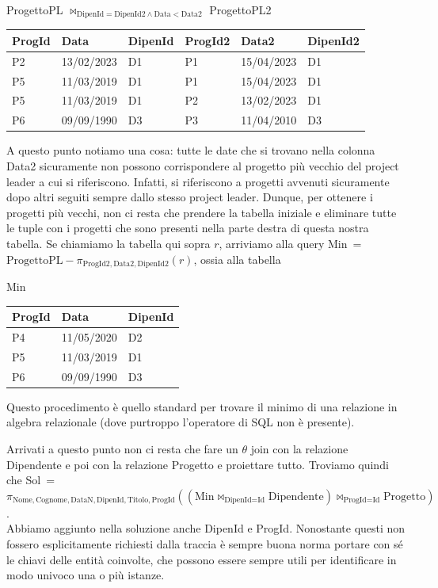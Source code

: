 \documentclass[11pt, a4paper, titlepage, oneside]{scrbook}
\begin{document}
\begin{center}
ProgettoPL $\bowtie_{\text{DipenId} = \text{DipenId2} \land \text{Data} < \text{Data2}}$ ProgettoPL2 \nopagebreak
    
\begin{tabular}{|l|l|l|l|l|l|}
\hline
\textbf{ProgId} & \textbf{Data} & \textbf{DipenId} & \textbf{ProgId2} & \textbf{Data2} & \textbf{DipenId2}\\ \hline
P2 & 13/02/2023 & D1 & P1 & 15/04/2023 & D1 \\
P5 & 11/03/2019 & D1 & P1 & 15/04/2023 & D1 \\
P5 & 11/03/2019 & D1 & P2 & 13/02/2023 & D1 \\
P6 & 09/09/1990 & D3 & P3 & 11/04/2010 & D3 \\\hline
\end{tabular}
\end{center}


A questo punto notiamo una cosa: tutte le date che si trovano nella colonna Data2 sicuramente non possono corrispondere al progetto più vecchio del project leader a cui si riferiscono. Infatti, si riferiscono a progetti avvenuti sicuramente dopo altri seguiti sempre dallo stesso project leader. Dunque, per ottenere i progetti più vecchi, non ci resta che prendere la tabella iniziale e eliminare tutte le tuple con i progetti che sono presenti nella parte destra di questa nostra tabella. Se chiamiamo la tabella qui sopra $r$, arriviamo alla query \mbox{Min = $\text{ProgettoPL} - \pi_{\text{ProgId2}, \text{Data2}, \text{DipenId2}}(r)$}, ossia alla tabella

\begin{center}
Min \nopagebreak
    
\begin{tabular}{|l|l|l|}
\hline
\textbf{ProgId} & \textbf{Data} & \textbf{DipenId}  \\ \hline
P4 & 11/05/2020 & D2 \\
P5 & 11/03/2019 & D1 \\
P6 & 09/09/1990 & D3 \\ \hline
\end{tabular}
\end{center}

Questo procedimento è quello standard per trovare il minimo di una relazione in algebra relazionale (dove purtroppo l'operatore  di SQL non è presente).

Arrivati a questo punto non ci resta che fare un $\theta$ join con la relazione Dipendente e poi con la relazione Progetto e proiettare tutto. Troviamo quindi che \mbox{Sol = $\pi_{\text{Nome}, \text{Cognome}, \text{DataN}, \text{DipenId}, \text{Titolo}, \text{ProgId}}((\text{Min} \bowtie_{\text{DipenId} = \text{Id}} \text{Dipendente}) \bowtie_{\text{ProgId} = \text{Id}} \text{Progetto})$}. \\
\NB Abbiamo aggiunto nella soluzione anche DipenId e ProgId. Nonostante questi non fossero esplicitamente richiesti dalla traccia è sempre buona norma portare con sé le chiavi delle entità coinvolte, che possono essere sempre utili per identificare in modo univoco una o più istanze.
\end{document}
